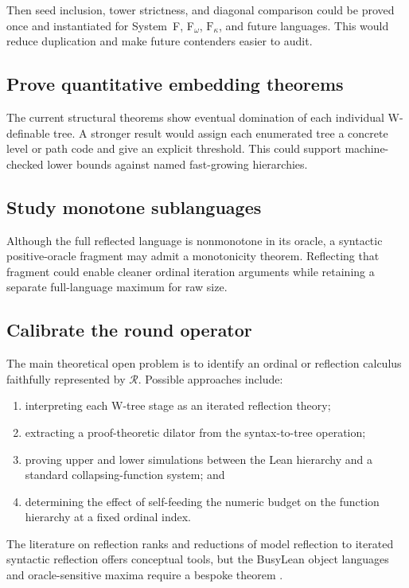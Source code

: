 \documentclass[11pt]{article}
\theoremstyle{definition}
\theoremstyle{remark}
\newcommand{\Fk}{\mathrm{F}_{\kappa}}
\newcommand{\Round}{\mathcal R}
\begin{document}
Then seed inclusion, tower strictness, and diagonal comparison could be proved
once and instantiated for System~F, F$_\omega$, $\Fk$, and future languages.
This would reduce duplication and make future contenders easier to audit.

\subsection{Prove quantitative embedding theorems}

The current structural theorems show eventual domination of each individual
W-definable tree. A stronger result would assign each enumerated tree a concrete
level or path code and give an explicit threshold. This could support machine-
checked lower bounds against named fast-growing hierarchies.

\subsection{Study monotone sublanguages}

Although the full reflected language is nonmonotone in its oracle, a syntactic
positive-oracle fragment may admit a monotonicity theorem. Reflecting that
fragment could enable cleaner ordinal iteration arguments while retaining a
separate full-language maximum for raw size.

\subsection{Calibrate the round operator}

The main theoretical open problem is to identify an ordinal or reflection
calculus faithfully represented by $\Round$. Possible approaches include:

\begin{enumerate}[leftmargin=*]
\item interpreting each W-tree stage as an iterated reflection theory;
\item extracting a proof-theoretic dilator from the syntax-to-tree operation;
\item proving upper and lower simulations between the Lean hierarchy and a
  standard collapsing-function system; and
\item determining the effect of self-feeding the numeric budget on the
  function hierarchy at a fixed ordinal index.
\end{enumerate}

The literature on reflection ranks and reductions of model reflection to
iterated syntactic reflection offers conceptual tools, but the BusyLean object
languages and oracle-sensitive maxima require a bespoke theorem
\cite{PakhomovWalshRank,PakhomovWalshOmega,Rathjen}.
\end{document}
